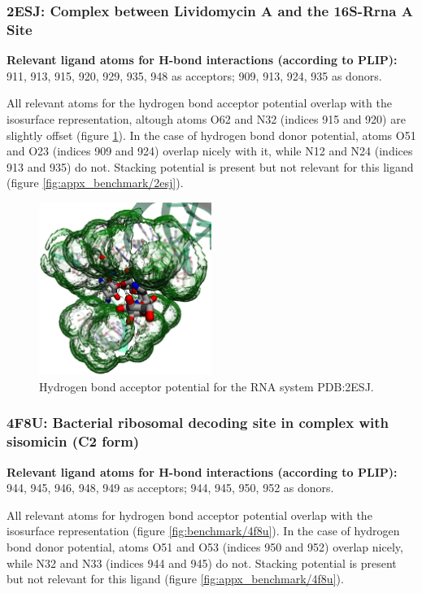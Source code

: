     \subsubsection{2ESJ: Complex between Lividomycin A and the 16S-Rrna A Site}
      \textbf{Relevant ligand atoms for H-bond interactions (according to PLIP):} 911, 913, 915, 920, 929, 935, 948 as acceptors; 909, 913, 924, 935 as donors.

      All relevant atoms for the hydrogen bond acceptor potential overlap with the isosurface representation, altough atoms O62 and N32 (indices 915 and 920) are slightly offset (figure \ref{fig:benchmark/2esj}). In the case of hydrogen bond donor potential, atoms O51 and O23 (indices 909 and 924) overlap nicely with it, while N12 and N24 (indices 913 and 935) do not. Stacking potential is present but not relevant for this ligand (figure \ref{fig:appx_benchmark/2esj}).

      \begin{figure}[H]
        \centering
        \includegraphics[width=0.5\textwidth]{figures/results/benchmark_rna/2esj.png}
        \caption{\label{fig:benchmark/2esj} Hydrogen bond acceptor potential for the RNA system PDB:2ESJ.}
      \end{figure}
    \pagebreak

    \subsubsection{4F8U: Bacterial ribosomal decoding site in complex with sisomicin (C2 form)}
      \textbf{Relevant ligand atoms for H-bond interactions (according to PLIP):} 944, 945, 946, 948, 949 as acceptors; 944, 945, 950, 952 as donors.

      All relevant atoms for hydrogen bond acceptor potential overlap with the isosurface representation (figure \ref{fig:benchmark/4f8u}). In the case of hydrogen bond donor potential, atoms O51 and O53 (indices 950 and 952) overlap nicely, while N32 and N33 (indices 944 and 945) do not. Stacking potential is present but not relevant for this ligand (figure \ref{fig:appx_benchmark/4f8u}).

